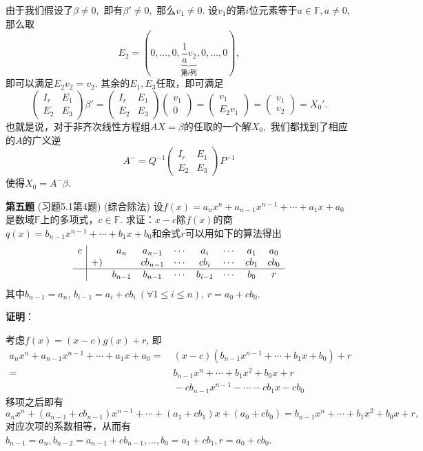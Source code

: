 由于我们假设了$\beta \neq 0,$ 即有$\beta' \neq 0,$ 那么$v_1 \neq 0$. 设$v_1$的第$i$位元素等于$a \in \mathbb{F}, a \neq 0,$ 那么取
$$E_2 = (0, \ldots, 0, \underbrace{\dfrac{1}{a}v_2}_{\text{第$i$列}}, 0, \ldots, 0),$$
即可以满足$E_2v_2 = v_2.$ 其余的$E_1, E_3$任取，即可满足
$$\begin{pmatrix} I_r & E_1 \\ E_2 & E_3 \end{pmatrix} \beta' = \begin{pmatrix} I_r & E_1 \\ E_2 & E_3 \end{pmatrix} \begin{pmatrix} v_1 \\ 0 \end{pmatrix} = \begin{pmatrix} v_1 \\ E_2v_1 \end{pmatrix} = \begin{pmatrix} v_1 \\ v_2 \end{pmatrix} = X_0'.$$
也就是说，对于非齐次线性方程组$AX = \beta$的任取的一个解$X_0,$ 我们都找到了相应的$A$的广义逆
$$A^- = Q^{-1} \begin{pmatrix} I_r & E_1 \\ E_2 & E_3 \end{pmatrix} P^{-1}$$
使得$X_0 = A^-\beta.$

\fi  %

\newpageorvspace

{\bf 第五题} (习题5.1第4题) (综合除法) 设$f(x) = a_nx^n + a_{n-1}x^{n-1} + \cdots + a_1x + a_0$是数域$\mathbb{F}$上的多项式，$c\in\mathbb{F}$. 求证：$x-c$除$f(x)$的商$q(x) = b_{n-1}x^{n-1} + \cdots + b_1x + b_0$和余式$r$可以用如下的算法得出
$$
\begin{array}{c|cccccccc}
c & & a_n & a_{n-1} & \cdots & a_i & \cdots & a_1 & a_0 \\
& +) & & cb_{n-1} & \cdots & cb_i & \cdots & cb_1 & cb_0 \\ \hline
& & b_{n-1} & b_{n-1} & \cdots & b_{i-1} & \cdots & b_0 & r
\end{array}
$$
其中$b_{n-1} = a_n$, $b_{i-1} = a_i + cb_i \ (\forall 1 \leqslant i \leqslant n)$, $r = a_0 + cb_0$.

\ifIncludeAnswer

\newpageorvspace

\textbf{证明}：

考虑$f(x) = (x-c)g(x) + r$, 即
\begin{align*}
a_nx^n + a_{n-1}x^{n-1} + \cdots + a_1x + a_0 = & \ (x-c) (b_{n-1}x^{n-1} + \cdots + b_1x + b_0) + r \\
= & \ b_{n-1}x^{n} + \cdots + b_1x^2 + b_0x + r \\
& \ - cb_{n-1}x^{n-1} - \cdots - cb_1x - cb_0
\end{align*}
移项之后即有
$$a_nx^n + (a_{n-1}+cb_{n-1})x^{n-1} + \cdots + (a_1+cb_1)x + (a_0 + cb_0) = b_{n-1}x^{n} + \cdots + b_1x^2 + b_0x + r,$$
对应次项的系数相等，从而有$b_{n-1} = a_n, b_{n-2} = a_{n-1}+cb_{n-1}, \ldots, b_0 = a_1+cb_1, r = a_0 + cb_0$.

\fi  %



